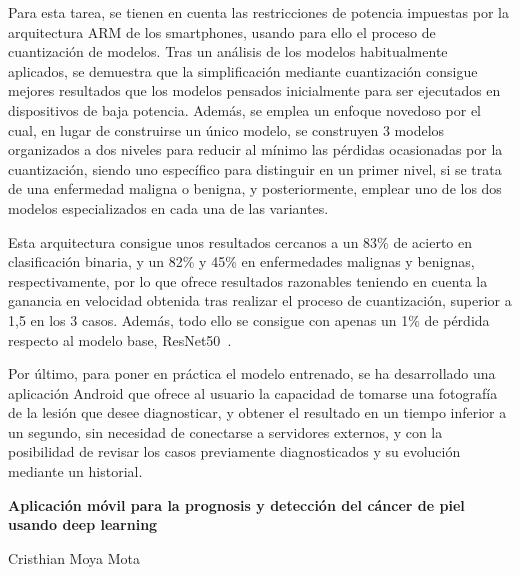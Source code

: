 Para esta tarea, se tienen en cuenta las restricciones de potencia impuestas por la arquitectura ARM de los smartphones, usando para ello el proceso de cuantización de modelos. Tras un análisis de los modelos habitualmente aplicados, se demuestra que la simplificación mediante cuantización consigue mejores resultados que los modelos pensados inicialmente para ser ejecutados en dispositivos de baja potencia. Además, se emplea un enfoque novedoso por el cual, en lugar de construirse un único modelo, se construyen 3 modelos organizados a dos niveles para reducir al mínimo las pérdidas ocasionadas por la cuantización, siendo uno específico para distinguir en un primer nivel, si se trata de una enfermedad maligna o benigna, y posteriormente, emplear uno de los dos modelos especializados en cada una de las variantes.

Esta arquitectura consigue unos resultados cercanos a un 83\% de acierto en clasificación binaria, y un 82\%  y 45\% en enfermedades malignas y benignas, respectivamente, por lo que ofrece resultados razonables teniendo en cuenta la ganancia en velocidad obtenida tras realizar el proceso de cuantización, superior a 1,5 en los 3 casos. Además, todo ello se consigue con apenas un 1\% de pérdida respecto al modelo base, ResNet50~\cite{he2015deep}.

Por último, para poner en práctica el modelo entrenado, se ha desarrollado una aplicación Android que ofrece al usuario la capacidad de tomarse una fotografía de la lesión que desee diagnosticar, y obtener el resultado en un tiempo inferior a un segundo, sin necesidad de conectarse a servidores externos, y con la posibilidad de revisar los casos previamente diagnosticados y su evolución mediante un historial. 

\cleardoublepage
\thispagestyle{empty}


\begin{center}
{\large\bfseries Aplicación móvil para la prognosis y detección del cáncer de piel usando deep learning}\\
\end{center}
\begin{center}
Cristhian Moya Mota\\
\end{center}

\\

